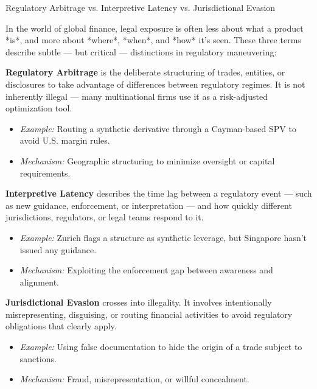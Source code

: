 \begin{TechnicalSidebar}{Regulatory Arbitrage vs. Interpretive Latency vs. Jurisdictional Evasion}

  In the world of global finance, legal exposure is often less about what a product *is*, and more about 
  *where*, *when*, and *how* it’s seen. These three terms describe subtle — but critical — distinctions 
  in regulatory maneuvering:
  
  \medskip
  
  \textbf{Regulatory Arbitrage}  
  is the deliberate structuring of trades, entities, or disclosures to take advantage of  
  differences between regulatory regimes.  
  It is not inherently illegal — many multinational firms use it as a risk-adjusted optimization tool.
  
  \begin{itemize}
    \item \textit{Example:} Routing a synthetic derivative through a Cayman-based SPV to avoid U.S. margin rules.
    \item \textit{Mechanism:} Geographic structuring to minimize oversight or capital requirements.
  \end{itemize}
  
  \medskip
  
  \textbf{Interpretive Latency}  
  describes the time lag between a regulatory event — such as new guidance, enforcement, or interpretation —  
  and how quickly different jurisdictions, regulators, or legal teams respond to it.
  
  \begin{itemize}
    \item \textit{Example:} Zurich flags a structure as synthetic leverage, but Singapore hasn’t issued any guidance.
    \item \textit{Mechanism:} Exploiting the enforcement gap between awareness and alignment.
  \end{itemize}
  
  \medskip
  
  \textbf{Jurisdictional Evasion}  
  crosses into illegality. It involves intentionally misrepresenting, disguising, or routing financial  
  activities to avoid regulatory obligations that clearly apply.
  
  \begin{itemize}
    \item \textit{Example:} Using false documentation to hide the origin of a trade subject to sanctions.
    \item \textit{Mechanism:} Fraud, misrepresentation, or willful concealment.
  \end{itemize}
  

\end{TechnicalSidebar}
